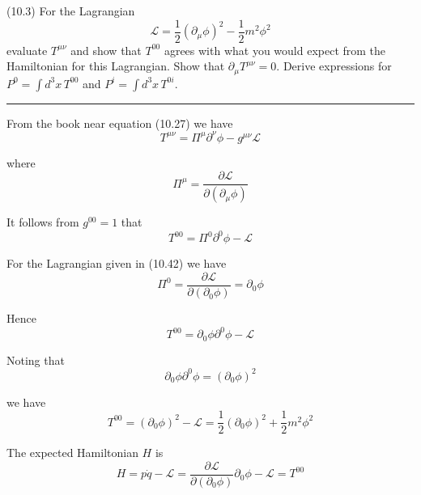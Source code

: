 \documentclass[12pt]{article}
\begin{document}
(10.3)
For the Lagrangian
\begin{equation*}
\mathcal L=\frac{1}{2}(\partial_\mu\phi)^2-\frac{1}{2}m^2\phi^2
\tag{10.42}
\end{equation*}
evaluate $T^{\mu\nu}$ and show that $T^{00}$ agrees with what
you would expect from the Hamiltonian for this Lagrangian.
Show that $\partial_\mu T^{\mu\nu}=0$. Derive expressions
for $P^0=\int d^3x\,T^{00}$ and $P^i=\int d^3x\,T^{0i}$.

\bigskip
\hrule

\bigskip
From the book near equation (10.27) we have
\begin{equation*}
T^{\mu\nu}=\Pi^\mu\partial^\nu\phi-g^{\mu\nu}\mathcal L
\end{equation*}

where
\begin{equation*}
\Pi^\mu=\frac{\partial\mathcal L}{\partial(\partial_\mu\phi)}
\end{equation*}

It follows from $g^{00}=1$ that
\begin{equation*}
T^{00}=\Pi^0\partial^0\phi-\mathcal L
\end{equation*}

For the Lagrangian given in (10.42) we have
\begin{equation*}
\Pi^0=\frac{\partial\mathcal L}{\partial(\partial_0\phi)}=\partial_0\phi
\end{equation*}

Hence
\begin{equation*}
T^{00}=\partial_0\phi\partial^0\phi-\mathcal L
\end{equation*}

Noting that
\begin{equation*}
\partial_0\phi\partial^0\phi=(\partial_0\phi)^2
\end{equation*}

we have
\begin{equation*}
T^{00}=(\partial_0\phi)^2-\mathcal L=\frac{1}{2}(\partial_0\phi)^2+\frac{1}{2}m^2\phi^2
\end{equation*}

The expected Hamiltonian $H$ is
\begin{equation*}
H=p\dot q-\mathcal L
=\frac{\partial\mathcal L}{\partial(\partial_0\phi)}\partial_0\phi-\mathcal L
=T^{00}
\end{equation*}
\end{document}
